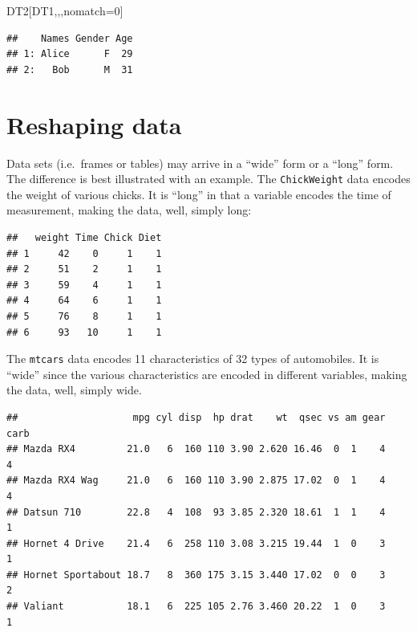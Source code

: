 \documentclass[]{book}
\newenvironment{Shaded}{\begin{snugshade}}{\end{snugshade}}
\newcommand{\DecValTok}[1]{\textcolor[rgb]{0.00,0.00,0.81}{#1}}
\newcommand{\NormalTok}[1]{#1}
\newcommand{\OperatorTok}[1]{\textcolor[rgb]{0.81,0.36,0.00}{\textbf{#1}}}
\newcommand{\StringTok}[1]{\textcolor[rgb]{0.31,0.60,0.02}{#1}}
\theoremstyle{definition}
\theoremstyle{definition}
\theoremstyle{definition}
\theoremstyle{remark}
\begin{document}
\begin{Shaded}
\begin{Highlighting}[]
\NormalTok{DT2[DT1,,,nomatch=}\DecValTok{0}\NormalTok{]}
\end{Highlighting}
\end{Shaded}

\begin{verbatim}
##    Names Gender Age
## 1: Alice      F  29
## 2:   Bob      M  31
\end{verbatim}

\hypertarget{reshaping-data}{%
\section{Reshaping data}\label{reshaping-data}}

Data sets (i.e.~frames or tables) may arrive in a ``wide'' form or a ``long'' form.
The difference is best illustrated with an example.
The \texttt{ChickWeight} data encodes the weight of various chicks. It is ``long'' in that a variable encodes the time of measurement, making the data, well, simply long:

\begin{Shaded}
\end{Shaded}

\begin{verbatim}
##   weight Time Chick Diet
## 1     42    0     1    1
## 2     51    2     1    1
## 3     59    4     1    1
## 4     64    6     1    1
## 5     76    8     1    1
## 6     93   10     1    1
\end{verbatim}

The \texttt{mtcars} data encodes 11 characteristics of 32 types of automobiles. It is ``wide'' since the various characteristics are encoded in different variables, making the data, well, simply wide.

\begin{Shaded}
\end{Shaded}

\begin{verbatim}
##                    mpg cyl disp  hp drat    wt  qsec vs am gear carb
## Mazda RX4         21.0   6  160 110 3.90 2.620 16.46  0  1    4    4
## Mazda RX4 Wag     21.0   6  160 110 3.90 2.875 17.02  0  1    4    4
## Datsun 710        22.8   4  108  93 3.85 2.320 18.61  1  1    4    1
## Hornet 4 Drive    21.4   6  258 110 3.08 3.215 19.44  1  0    3    1
## Hornet Sportabout 18.7   8  360 175 3.15 3.440 17.02  0  0    3    2
## Valiant           18.1   6  225 105 2.76 3.460 20.22  1  0    3    1
\end{verbatim}
\end{document}
